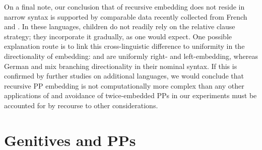 \documentclass[output=paper]{langsci/langscibook}
\begin{document}
On a final note, our conclusion that  of
recursive embedding does not reside in narrow syntax is supported
by comparable data recently collected from French and 
\parencite{BambaEtAl2016,Robergeetal2018}. In these languages, children do not
readily rely on the relative clause strategy; they
incorporate it gradually, as one would expect. One possible explanation route is
to link this cross-linguistic difference to uniformity in the directionality of
embedding:  and  are uniformly right- and
left-embedding, whereas German and  mix branching directionality in
their nominal syntax.  If this is confirmed by further studies on additional
languages, we would conclude that recursive PP embedding is not
computationally more complex than any other applications of  and
avoidance of twice-embedded PPs in our experiments must be accounted for by
recourse to other considerations.

\section{Genitives and PPs}
\end{document}
